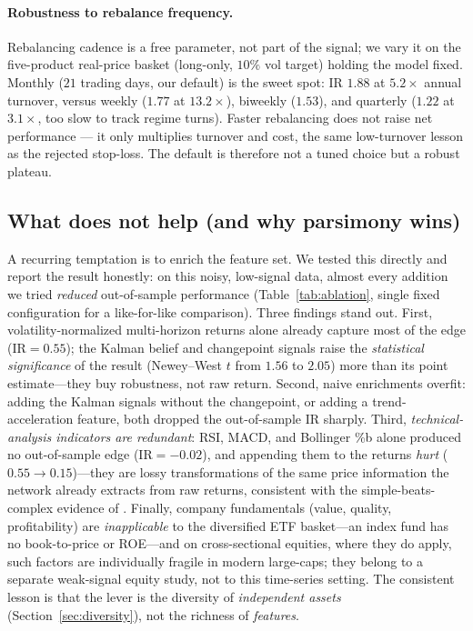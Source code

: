 \documentclass[11pt,a4paper]{article}
\theoremstyle{definition}
\newcommand{\IR}{\mathrm{IR}}
\begin{document}
\paragraph{Robustness to rebalance frequency.} Rebalancing cadence is a free parameter, not part of
the signal; we vary it on the five-product real-price basket (long-only, $10\%$ vol target) holding
the model fixed. Monthly ($21$ trading days, our default) is the sweet spot: IR $1.88$ at $5.2\times$
annual turnover, versus weekly ($1.77$ at $13.2\times$), biweekly ($1.53$), and quarterly ($1.22$ at
$3.1\times$, too slow to track regime turns). Faster rebalancing does not raise net performance --- it
only multiplies turnover and cost, the same low-turnover lesson as the rejected stop-loss. The default
is therefore not a tuned choice but a robust plateau.

\subsection{What does not help (and why parsimony wins)}
\label{sec:ablation}

A recurring temptation is to enrich the feature set. We tested this directly and report the
result honestly: on this noisy, low-signal data, almost every addition we tried \emph{reduced}
out-of-sample performance (Table~\ref{tab:ablation}, single fixed configuration for a like-for-like
comparison). Three findings stand out. First, volatility-normalized multi-horizon returns alone
already capture most of the edge ($\IR=0.55$); the Kalman belief and changepoint signals raise the
\emph{statistical significance} of the result (Newey--West $t$ from $1.56$ to $2.05$) more than its
point estimate---they buy robustness, not raw return. Second, naive enrichments overfit: adding the
Kalman signals without the changepoint, or adding a trend-acceleration feature, both dropped the
out-of-sample $\IR$ sharply. Third, \emph{technical-analysis indicators are redundant}: RSI, MACD,
and Bollinger \%b alone produced no out-of-sample edge ($\IR=-0.02$), and appending them to the
returns \emph{hurt} ($0.55\!\to\!0.15$)---they are lossy transformations of the same price
information the network already extracts from raw returns, consistent with the simple-beats-complex
evidence of \cite{zeng2023}. Finally, company fundamentals (value, quality, profitability) are
\emph{inapplicable} to the diversified ETF basket---an index fund has no book-to-price or ROE---and
on cross-sectional equities, where they do apply, such factors are individually fragile in modern
large-caps; they belong to a separate weak-signal equity study, not to this time-series setting.
The consistent lesson is that the lever is the diversity of \emph{independent assets}
(Section~\ref{sec:diversity}), not the richness of \emph{features}.
\end{document}
